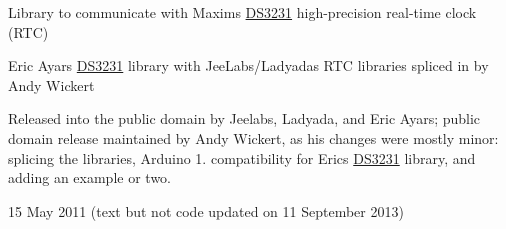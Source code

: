 Library to communicate with Maxim\textquotesingle{}s \hyperlink{class_d_s3231}{D\+S3231} high-\/precision real-\/time clock (R\+TC)

Eric Ayars \hyperlink{class_d_s3231}{D\+S3231} library with Jee\+Labs/\+Ladyada\textquotesingle{}s R\+TC libraries spliced in by Andy Wickert

Released into the public domain by Jeelabs, Ladyada, and Eric Ayars; public domain release maintained by Andy Wickert, as his changes were mostly minor\+: splicing the libraries, Arduino 1. compatibility for Eric\textquotesingle{}s \hyperlink{class_d_s3231}{D\+S3231} library, and adding an example or two.

15 May 2011 (text but not code updated on 11 September 2013) 